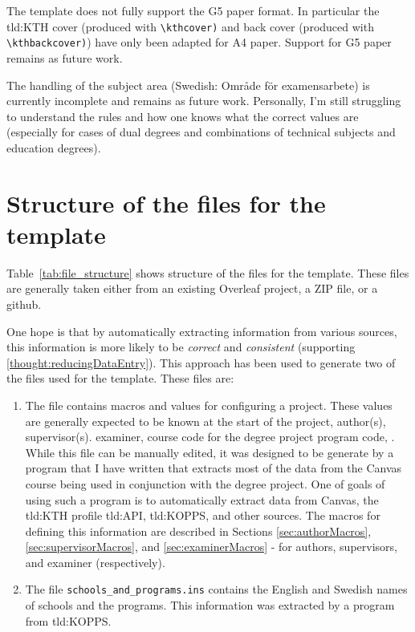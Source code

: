 The template does not fully support the G5 paper format. In particular the \gls{tld:KTH} cover (produced with \texttt{\textbackslash kthcover)} and back cover (produced with \texttt{\textbackslash kthbackcover)}) have only been adapted for A4 paper. Support for G5 paper remains as future work.

The handling of the subject area (Swedish: Område för examensarbete) is currently incomplete and remains as future work. Personally, I'm still struggling to understand the rules and how one knows what the correct values are (especially for cases of \first dual degrees and \second combinations of technical subjects and education degrees).

\section{Structure of the files for the template}
Table~\ref{tab:file_structure} shows structure of the files for the template. These files are generally taken either from an existing Overleaf project, a ZIP file, or a github.

One hope is that by automatically extracting information from various sources, this information is more likely to be \textit{correct} and \textit{consistent} (supporting \ref{thought:reducingDataEntry}). This approach has been used to generate two of the files used for the template. These files are:
\begin{enumerate}
    \item The file  contains macros and values for configuring a project. These values are generally expected to be known at the start of the project, \eg author(s), supervisor(s). examiner, course code for the degree project program code, \etc. While this file can be manually edited, it was designed to be generate by a program that I have written that extracts most of the data from the Canvas course being used in conjunction with the degree project. One of goals of using such a program is to automatically extract data from Canvas, the \gls{tld:KTH} profile \gls{tld:API}, \gls{tld:KOPPS}, and other sources. The macros for defining this information are described in Sections \ref{sec:authorMacros}, \ref{sec:supervisorMacros}, and \ref{sec:examinerMacros} - for authors, supervisors, and examiner (respectively).

    \item The file \texttt{schools\_and\_programs.ins} contains the English and Swedish names of schools and the programs. This information was extracted by a program from \gls{tld:KOPPS}.
\end{enumerate}

